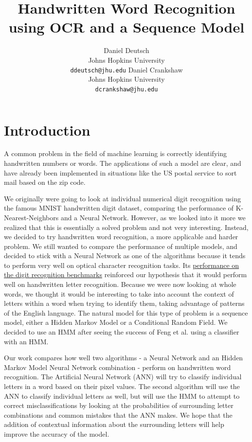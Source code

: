 \documentclass[11pt,letterpaper]{article}
\title{Handwritten Word Recognition using OCR and a Sequence Model}
\author{Daniel Deutsch\\
  Johns Hopkins University\\
  {\tt ddeutsch@jhu.edu}
  \And
  Daniel Crankshaw \\
  Johns Hopkins University \\
  {\tt dcrankshaw@jhu.edu}}
\date{}
\begin{document}
\maketitle

\section{Introduction}

A common problem in the field of machine learning is correctly identifying
handwritten numbers or words. The applications of
such a model are clear, and have already been implemented in situations like
the US postal service to sort mail based on the zip code.

We originally were going to look at individual numerical digit recognition using the famous
MNIST handwritten digit dataset, comparing the performance of K-Nearest-Neighbors and a
Neural Network. However, as we looked into it more we realized that this is essentially a solved
problem and not very interesting. Instead, we decided to try handwritten word recognition,
a more applicable and harder problem. We still wanted to compare the performance of multiple
models, and decided to stick with a Neural Network as one of the algorithms because it tends to
perform very well on optical character recognition tasks. Its \href{http://yann.lecun.com/exdb/mnist/index.html}{performance on the digit recognition benchmarks} reinforced our hypothesis that it would perform well on handwritten letter
recognition. Because we were now looking at whole words, we thought it would be interesting to take
into account the context of letters within a word when trying to identify them, taking advantage of
patterns of the English language. The natural model for this type of problem is a sequence model,
either a Hidden Markov Model or a Conditional Random Field. We decided to use an HMM after seeing
the success of Feng et al. \cite{feng} using a classifier with an HMM.

Our work compares how well two algorithms - a Neural Network and an Hidden Markov Model Neural
Network combination - perform on handwritten word recognition. The Artificial Neural Network (ANN) will
try to classify individual letters in a word based on their pixel values. The second algorithm will
use the ANN to classify individual letters as well, but will use the HMM to attempt to correct
misclassifications by looking at the probabilities of surrounding letter combinations and common
mistakes that the ANN makes. We hope that the addition of contextual information
about the surrounding letters will help improve the accuracy of the model.
\end{document}
